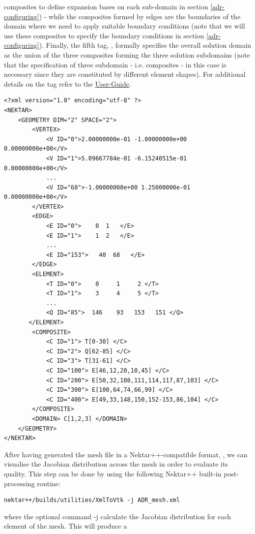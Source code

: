 composites to define expansion bases on each sub-domain in section \ref{adr-configuring}) 
- while the composites formed by edges are the boundaries of the domain where we need 
to apply suitable boundary conditions (note that we will use these composites to specify 
the boundary conditions in section \ref{adr-configuring}). 
Finally, the fifth tag, , formally specifies the overall solution domain as the 
union of the three composites forming the three solution subdomains (note that the specification 
of three subdomain - i.e. composites - in this case is necessary since they are constituted 
by different element shapes). For additional details on the  tag refer 
to the \href{http://www.nektar.info/downloads/8}{User-Guide}.
%
\begin{lstlisting}[style=XMLStyle]
<?xml version="1.0" encoding="utf-8" ?>
<NEKTAR>
    <GEOMETRY DIM="2" SPACE="2">
        <VERTEX>
            <V ID="0">2.00000000e-01 -1.00000000e+00 0.00000000e+00</V>
            <V ID="1">5.09667784e-01 -6.15240515e-01 0.00000000e+00</V>
            ...
            <V ID="68">-1.00000000e+00 1.25000000e-01 0.00000000e+00</V>
        </VERTEX>
        <EDGE>
            <E ID="0">    0  1   </E>
            <E ID="1">    1  2   </E>
            ...
            <E ID="153">   40  68   </E>
        </EDGE>
        <ELEMENT>
            <T ID="0">    0     1     2 </T>
            <T ID="1">    3     4     5 </T>
            ...
            <Q ID="85">  146    93   153   151 </Q>
       </ELEMENT>
        <COMPOSITE>
            <C ID="1"> T[0-30] </C>
            <C ID="2"> Q[62-85] </C>
            <C ID="3"> T[31-61] </C>
            <C ID="100"> E[46,12,20,10,45] </C>
            <C ID="200"> E[50,32,108,111,114,117,87,103] </C>
            <C ID="300"> E[100,64,74,66,99] </C>
            <C ID="400"> E[49,33,148,150,152-153,86,104] </C>
        </COMPOSITE>
        <DOMAIN> C[1,2,3] </DOMAIN>
    </GEOMETRY>
</NEKTAR>
\end{lstlisting}      
%
After having generated the mesh file in a Nektar++-compatible format, , 
we can visualise the Jacobian distribution across the mesh in order to evaluate its quality. 
This step can be done by using the following Nektar++ built-in post-processing routine:
%
\begin{lstlisting}[style=BashInputStyle]
nektar++/builds/utilities/XmlToVtk -j ADR_mesh.xml 
\end{lstlisting}
%
where the optional command -j calculate the Jacobian distribution for
each element of the mesh.  This will produce a 

